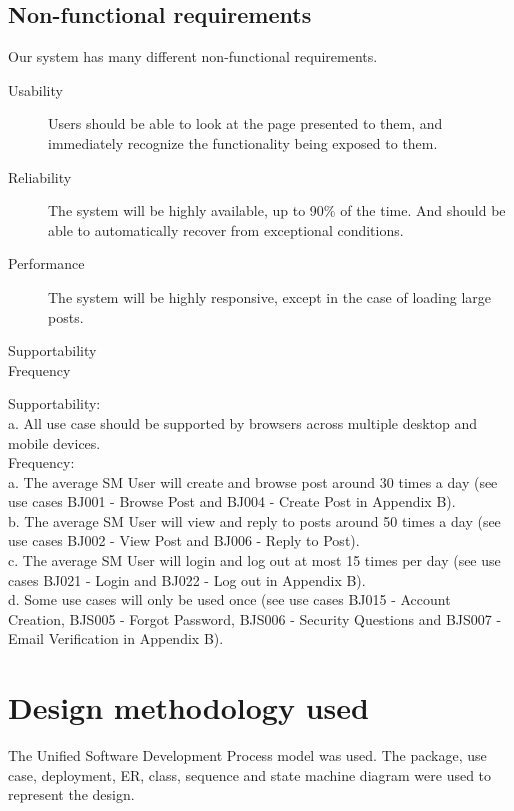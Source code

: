 \documentclass{report}
\begin{document}
	\subsection{Non-functional requirements}
	Our system has many different non-functional requirements.
	\begin{description}
		\item [Usability] Users should be able to look at the page presented to them,
		and immediately recognize the functionality being exposed to them.
		\item [Reliability] The system will be highly available, up to 90\% of the time.
		And should be able to automatically recover from exceptional conditions.
		\item [Performance] The system will be highly responsive,
		except in the case of loading large posts.
		\item [Supportability]
		\item [Frequency]
	\end{description}

	Supportability: \\
		a.	All use case should be supported by browsers across multiple desktop and mobile devices.\\
	Frequency:\\
		a.	The average SM User will create and browse post around 30 times a day (see use cases BJ001 - Browse Post and BJ004 - Create Post in Appendix B).\\
		b.	The average SM User will view and reply to posts around 50 times a day (see use cases BJ002 - View Post and BJ006 - Reply to Post).\\
		c.	The average SM User will login and log out at most 15 times per day (see use cases BJ021 - Login and BJ022 - Log out in Appendix B).\\
		d.	Some use cases will only be used once (see use cases BJ015 - Account Creation, BJS005 - Forgot Password, BJS006 - Security Questions and BJS007 - Email Verification in Appendix B).\\
\section{Design methodology used} 
	The Unified Software Development Process model was used.
	The package, use case, deployment, ER, class, sequence and state machine diagram were used to represent the design.
\end{document}
